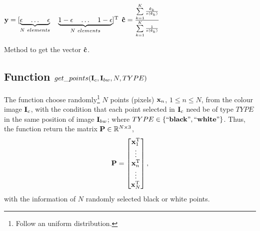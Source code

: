 \begin{algorithm}
 ~\\
 $\VECTOR{y}=[\underbrace{\epsilon   \quad \hdots \quad \epsilon }_{N~elements} \quad 
\underbrace{ 1-\epsilon \quad \hdots \quad 1-\epsilon }_{N~elements}]^{\transpose}$\;
 $\VECTOR{\hat{c}}=\frac{\sum\limits_{k=1}^{K} \frac{\VECTOR{\hat{c}}_k}{e(\VECTOR{\hat{c}}_k)}}{\sum\limits_{k=1}^{K} \frac{1}{e(\VECTOR{\hat{c}}_k)}}$\;
 \caption{Method to get the vector $\VECTOR{\hat{c}}$.}
\label{alg:alg1}
\end{algorithm}

\subsection{Function $get\_points(\MATRIX{I}_c,\MATRIX{I}_{bw},N,TYPE)$}
The function choose randomly\footnote{Follow an uniform distribution.}
$N$ points (pixels) $\VECTOR{x}_n$, $1 \leq n \leq N$,
from the colour image $\MATRIX{I}_c$,
with the condition that each point selected in $\MATRIX{I}_c$ need be of type $TYPE$
in the same position of image $\MATRIX{I}_{bw}$;
where $TYPE \in \{``\mathbf{black}",``\mathbf{white}"\}$. 
Thus, the function return the matrix $\MATRIX{P} \in \mathbb{R}^{N \times 3}$,
\begin{equation}
\MATRIX{P}=
\begin{bmatrix}
\VECTOR{x}_1^{\transpose}  \\
\vdots  \\
\VECTOR{x}_n^{\transpose}  \\
\vdots \\
\VECTOR{x}_N^{\transpose} \\
\end{bmatrix},
\end{equation} 
with the information of $N$ randomly selected black or white points.


